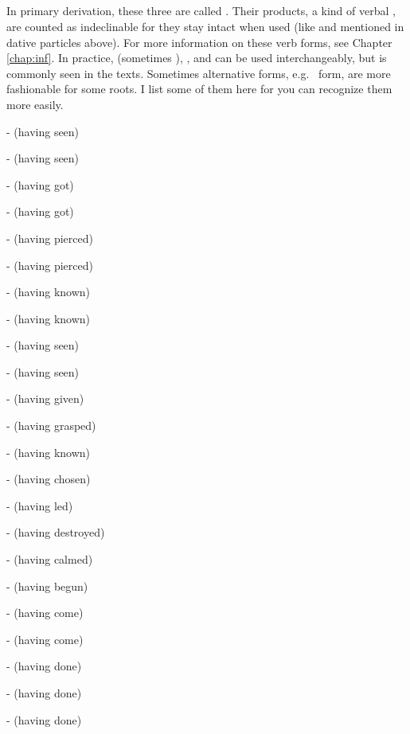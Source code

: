 \subsection*{}\label{nip:tuna}\label{nip:tvaana}\label{nip:tvaa}
In primary derivation, these three are called . Their products, a kind of verbal , are counted as indeclinable for they stay intact when used (like  and  mentioned in dative particles above). For more information on these verb forms, see Chapter \ref{chap:inf}. In practice,  (sometimes ), , and  can be used interchangeably, but  is commonly seen in the texts. Sometimes alternative forms, e.g.\  form, are more fashionable for some roots. I list some of them here for you can recognize them more easily.\par
-  (having seen) \par
-  (having seen) \par
-  (having got) \par
-  (having got) \par
-  (having pierced) \par
-  (having pierced) \par
-  (having known) \par
-  (having known) \par
-  (having seen) \par
-  (having seen) \par
-  (having given) \par
-  (having grasped) \par
-  (having known) \par
-  (having chosen) \par
-  (having led) \par
-  (having destroyed) \par
-  (having calmed) \par
-  (having begun) \par
-  (having come) \par
-  (having come) \par
-  (having done) \par
-  (having done) \par
-  (having done) \par

